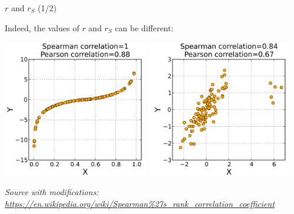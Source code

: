 \documentclass{beamer}
\begin{document}
\begin{frame}
{\centerline{$r$ and $r_S$ (1/2)}}

Indeed, the values of $r$ and $r_S$ can be different:

\begin{center}
\includegraphics[width=0.475\textwidth]{P2023.AIBCCSS.InferenceAndLogisticRegression/600px-Spearman_fig1.png}
\includegraphics[width=0.475\textwidth]{P2023.AIBCCSS.InferenceAndLogisticRegression/600px-Spearman_fig3.png}

\end{center} 

\textit{\tiny
\vspace{-\baselineskip}
Source with modifications: \url{https://en.wikipedia.org/wiki/Spearman\%27s_rank_correlation_coefficient}}

\end{frame}
\end{document}
